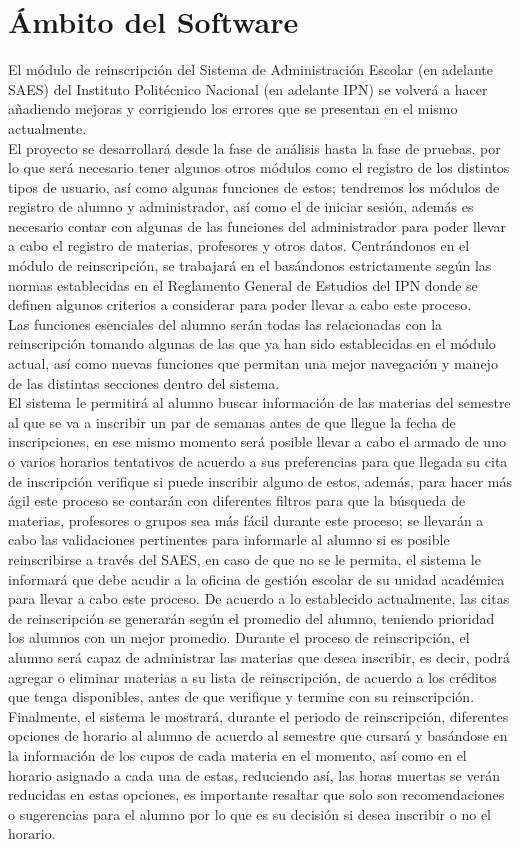 \chapter{Ámbito del Software}
\noindent
El módulo de reinscripción del Sistema de Administración Escolar (en adelante SAES) del Instituto Politécnico Nacional (en adelante IPN) se volverá a hacer añadiendo mejoras y corrigiendo los errores que se presentan en el mismo actualmente.\\
El proyecto se desarrollará desde la fase de análisis hasta la fase de pruebas, por lo que será necesario tener algunos otros módulos como el registro de los distintos tipos de usuario, así como algunas funciones de estos; tendremos los módulos de registro de alumno y administrador, así como el de iniciar sesión, además es necesario contar con algunas de las funciones del administrador para poder llevar a cabo el registro de materias, profesores y otros datos.
Centrándonos en el módulo de reinscripción, se trabajará en el basándonos estrictamente según las normas establecidas en el Reglamento General de Estudios del IPN donde se definen algunos criterios a considerar para poder llevar a cabo este proceso.\\
Las funciones esenciales del alumno serán todas las relacionadas con la reinscripción tomando algunas de las que ya han sido establecidas en el módulo actual, así como nuevas funciones que permitan una mejor navegación y manejo de las distintas secciones dentro del sistema.\\
El sistema le permitirá al alumno buscar información de las materias del semestre al que se va a inscribir un par de semanas antes de que llegue la fecha de inscripciones, en ese mismo momento será posible llevar a cabo el armado de uno o varios horarios tentativos de acuerdo a sus preferencias para que llegada su cita de inscripción verifique si puede inscribir alguno de estos, además, para hacer más ágil este proceso se contarán con diferentes filtros para que la búsqueda de materias, profesores o grupos sea más fácil durante este proceso; se llevarán a cabo las validaciones pertinentes para informarle al alumno si es posible reinscribirse a través del SAES, en caso de que no se le permita, el sistema le informará que debe acudir a la oficina de gestión escolar de su unidad académica para llevar a cabo este proceso. 
\newpage
\noindent
De acuerdo a lo establecido actualmente, las citas de reinscripción se generarán según el promedio del alumno, teniendo prioridad los alumnos con un mejor promedio. Durante el proceso de reinscripción, el alumno será capaz de administrar las materias que desea inscribir, es decir, podrá agregar o eliminar materias a su lista de reinscripción, de acuerdo a los créditos que tenga disponibles, antes de que verifique y termine con su reinscripción.\\
Finalmente, el sistema le mostrará, durante el periodo de reinscripción, diferentes opciones de horario al alumno de acuerdo al semestre que cursará y basándose en la información de los cupos de cada materia en el momento, así como en el horario asignado a cada una de estas, reduciendo así, las horas muertas se verán reducidas en estas opciones, es importante resaltar que solo son recomendaciones o sugerencias para el alumno por lo que es su decisión si desea inscribir o no el horario. 
